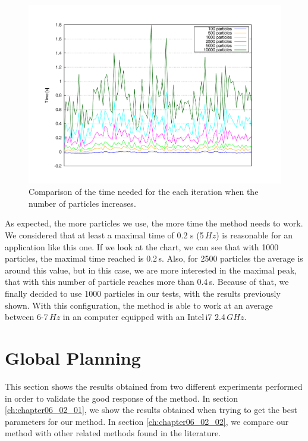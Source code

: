 \begin{figure}[th]
  \centering
  \includegraphics[trim=50 50 90 60, clip]{timesVsParticles}
  \caption{Comparison of the time needed for the each iteration when the number of particles increases.}\label{fig:cp05_time_vs_particles}
\end{figure}

As expected, the more particles we use, the more time the method needs to work. We considered that at least a maximal time of 0.2 s (5\,$Hz$) is reasonable for an application like this one. If we look at the chart, we can see that with 1000 particles, the maximal time reached is 0.2\,s. Also, for 2500 particles the average is around this value, but in this case, we are more interested in the maximal peak, that with this number of particle reaches more than 0.4\,s. Because of that, we finally decided to use 1000 particles in our tests, with the results previously shown. With this configuration, the method is able to work at an average between 6-7\,$Hz$ in an computer equipped with an Intel\textregistered\,i7 2.4\,$GHz$.
 
\graphicspath{{./images/chapter06/bmps/}{./images/chapter06/vects/}{./images/chapter06/}}

\section{Global Planning}\label{ch:chapter06_02}

This section shows the results obtained from two different experiments performed in order to validate the good response of the method. In section \ref{ch:chapter06_02_01}, we show the results obtained when trying to get the best parameters for our method. In section \ref{ch:chapter06_02_02}, we compare our method with other related methods found in the literature.


